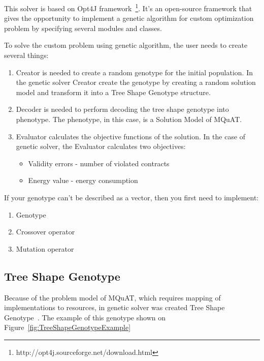This solver is based on Opt4J framework~\footnote{http://opt4j.sourceforge.net/download.html}. It's an open-source framework that gives the opportunity to implement a genetic algorithm for custom optimization problem by specifying several modules and classes.

To solve the custom problem using genetic algorithm, the user needs to create several things:

\begin{enumerate}
	\item Creator is needed to create a random genotype for the initial population.
	In the genetic solver Creator create the genotype by creating a random solution model and transform it into a Tree Shape Genotype structure.
	\item Decoder is needed to perform decoding the tree shape genotype into phenotype. The phenotype, in this case, is a Solution Model of MQuAT.
	\item Evaluator calculates the objective functions of the solution. In the case of genetic solver, the Evaluator calculates two objectives: 
	
	\begin{itemize}
		\item Validity errors - number of violated contracts
		\item Energy value - energy consumption
	\end{itemize}

\end{enumerate}

If your genotype can't be described as a vector, then you first need to implement:

\begin{enumerate}
	\item Genotype
	\item Crossover operator
	\item Mutation operator
\end{enumerate}

\subsection{Tree Shape Genotype}

Because of the problem model of MQuAT, which requires mapping of implementations to resources, in genetic solver was created Tree Shape Genotype~\cite{ahmad18}.
The example of this genotype shown on Figure~\ref{fig:TreeShapeGenotypeExample}

